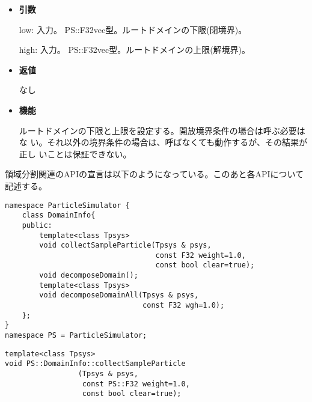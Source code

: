 \begin{itemize}

\item {\bf 引数}

low: 入力。 PS::F32vec型。ルートドメインの下限(閉境界)。

high: 入力。 PS::F32vec型。ルートドメインの上限(解境界)。

\item {\bf 返値}

なし

\item {\bf 機能}

ルートドメインの下限と上限を設定する。開放境界条件の場合は呼ぶ必要はな
い。それ以外の境界条件の場合は、呼ばなくても動作するが、その結果が正し
いことは保証できない。

\end{itemize}


領域分割関連のAPIの宣言は以下のようになっている。このあと各APIについて
記述する。
\begin{lstlisting}[caption=DomainInfo2]
namespace ParticleSimulator {
    class DomainInfo{
    public:
        template<class Tpsys>
        void collectSampleParticle(Tpsys & psys,
                                   const F32 weight=1.0,
                                   const bool clear=true);
        void decomposeDomain();
        template<class Tpsys>
        void decomposeDomainAll(Tpsys & psys,
                                const F32 wgh=1.0);
    };
}
namespace PS = ParticleSimulator;
\end{lstlisting}


\begin{screen}
\begin{verbatim}
template<class Tpsys>
void PS::DomainInfo::collectSampleParticle
                 (Tpsys & psys,
                  const PS::F32 weight=1.0,
                  const bool clear=true);
\end{verbatim}
\end{screen}

